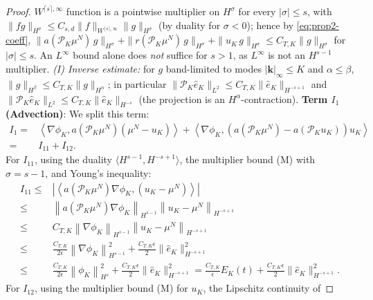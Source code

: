 \documentclass[a4paper,fleqn]{cas-sc}
\theoremstyle{definition}
\theoremstyle{remark}
\begin{document}
\begin{proof}
$W^{\lceil s\rceil,\infty}$ function is a pointwise multiplier on $H^\sigma$ for every
$|\sigma|\le s$, with $\|fg\|_{H^\sigma}\le C_{s,d}\|f\|_{W^{\lceil s\rceil,\infty}}\|g\|_{H^\sigma}$
(by duality for $\sigma<0$); hence by \eqref{eq:prop2-coeff},
$\|a(\mathcal P_K\mu^N)\,g\|_{H^\sigma}+\|r(\mathcal P_K\mu^N)\,g\|_{H^\sigma}+\|u_K\,g\|_{H^\sigma}\le C_{T,K}\|g\|_{H^\sigma}$
for $|\sigma|\le s$. An $L^\infty$ bound alone does \emph{not} suffice for $s>1$, as
$L^\infty$ is not an $H^{s-1}$ multiplier. \emph{(I) Inverse estimate:} for $g$
band-limited to modes $|\mathbf k|_\infty\le K$ and $\alpha\le\beta$,
$\|g\|_{H^\beta}\le C_{T,K}\|g\|_{H^\alpha}$; in particular
$\|\mathcal P_K\hat e_K\|_{L^2}\le C_{T,K}\|\hat e_K\|_{H^{-s+1}}$ and
$\|\mathcal P_K\hat e_K\|_{L^2}\le C_{T,K}\|\hat e_K\|_{H^{-s}}$ (the projection is an
$H^\alpha$-contraction).
\textbf{Term $I_1$ (Advection)}: We split this term: 
\begin{equation}
    \begin{aligned}
        I_1 
        = &  
         \left\langle \nabla  \phi_K,  a(\mathcal P_K \mu^N ) ( \mu^N - u_K )\right\rangle 
        +
        \left\langle \nabla  \phi_K,  \left( a(\mathcal P_K \mu^N) - a(\mathcal P_K u_K) \right) u_K \right\rangle \\
        =& I_{11} + I_{12}.
    \end{aligned}
\end{equation}
For $I_{11}$, using the duality $\langle H^{s-1}, H^{-s+1}\rangle$, the multiplier
bound (M) with $\sigma=s-1$, and Young's inequality:
\[
\begin{aligned}
    I_{11}
        \leq & 
        \left|\left\langle a(\mathcal P_K \mu^N)  \nabla  \phi_K,   (u_K - \mu^N )\right\rangle\right|\\
        \leq& \left\|a(\mathcal P_K \mu^N)  \nabla  \phi_K\right\|_{H^{s-1}} \left\|u_K - \mu^N \right\|_{H^{-s+1}} \\
        \leq& C_{T,K} \left\|\nabla  \phi_K\right\|_{H^{s-1}} \left\|u_K - \mu^N \right\|_{H^{-s+1}} \\
        \leq& \frac{C_{T,K}}{2\epsilon}\left\|\nabla  \phi_K\right\|_{H^{s-1}}^2 + \frac{C_{T,K}\epsilon}{2}\|\hat{e}_K\|^2_{H^{-s+1}}\\
         \leq& \frac{C_{T,K}}{2\epsilon}\left\|  \phi_K\right\|_{H^{s}}^2 + \frac{C_{T,K}\epsilon}{2}\|\hat{e}_K\|^2_{H^{-s+1}}
        = \frac{C_{T,K}}{\epsilon} E_K(t)+ \frac{C_{T,K}\epsilon}{2}\|\hat{e}_K\|^2_{H^{-s+1}}.
\end{aligned}
\]
For $I_{12}$, using the multiplier bound (M) for $u_K$, the Lipschitz continuity of

\end{proof}
\end{document}
